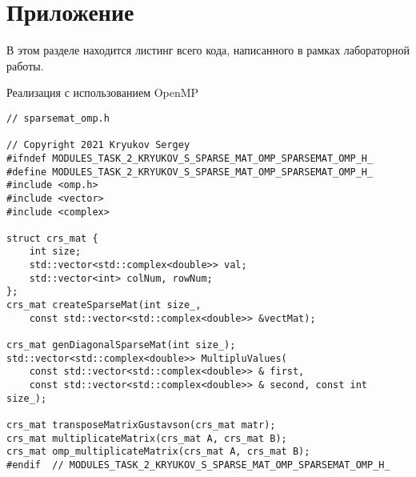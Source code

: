 \documentclass{report}
\begin{document}
\section*{Приложение}
В этом разделе находится листинг всего кода, написанного в рамках лабораторной работы.
\par Реализация с использованием OpenMP
\begin{lstlisting}
// sparsemat_omp.h

// Copyright 2021 Kryukov Sergey
#ifndef MODULES_TASK_2_KRYUKOV_S_SPARSE_MAT_OMP_SPARSEMAT_OMP_H_
#define MODULES_TASK_2_KRYUKOV_S_SPARSE_MAT_OMP_SPARSEMAT_OMP_H_
#include <omp.h>
#include <vector>
#include <complex>

struct crs_mat {
    int size;
    std::vector<std::complex<double>> val;
    std::vector<int> colNum, rowNum;
};
crs_mat createSparseMat(int size_,
    const std::vector<std::complex<double>> &vectMat);

crs_mat genDiagonalSparseMat(int size_);
std::vector<std::complex<double>> MultipluValues(
    const std::vector<std::complex<double>> & first,
    const std::vector<std::complex<double>> & second, const int size_);

crs_mat transposeMatrixGustavson(crs_mat matr);
crs_mat multiplicateMatrix(crs_mat A, crs_mat B);
crs_mat omp_multiplicateMatrix(crs_mat A, crs_mat B);
#endif  // MODULES_TASK_2_KRYUKOV_S_SPARSE_MAT_OMP_SPARSEMAT_OMP_H_
\end{lstlisting}
\end{document}
